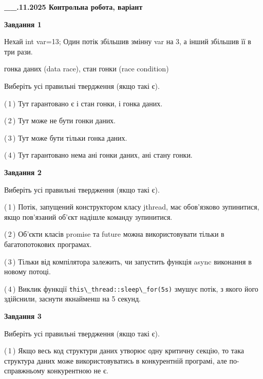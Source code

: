 \documentclass[12pt, ukrainian]{article}
\def\code#1{\Verb!#1!}
\begin{document}
\begin {large}

\textbf{\_\_.11.2025 Контрольна робота, варіант  }\par


{

\begin{center}
\textbf{Завдання 1}
\end{center}
Нехай int var=13; Один потік збільшив змінну var на 3, а інший збільшив її в три рази.

гонка даних (data race), стан гонки (race condition)

Виберіть усі правильні твердження (якщо такі є).\par
\vspace{2mm}
(\,1\,) Тут гарантовано є і стан гонки, і гонка даних.%

(\,2\,) Тут може не бути гонки даних.%

(\,3\,) Тут може бути тільки гонка даних.%

(\,4\,) Тут гарантовано нема ані гонки даних, ані стану гонки.%



\begin{center}
\textbf{Завдання 2}
\end{center}
Виберіть усі правильні твердження (якщо такі є).\par
\vspace{2mm}

(\,1\,) Потік, запущений конструктором класу jthread, має обов’язково зупинитися, якщо пов’язаний об’єкт надішле команду зупинитися.%

(\,2\,) Об’єкти класів promise та future можна використовувати тільки в багатопотокових програмах.%

(\,3\,) Тільки від компілятора залежить, чи запустить функція async виконання в новому потоці.%

(\,4\,) Виклик функції \code{this\_thread::sleep\_for(5s)} змушує потік, з якого його здійснили, заснути якнайменш на 5 секунд.%



\begin{center}
\textbf{Завдання 3}
\end{center}
Виберіть усі правильні твердження (якщо такі є).\par
\vspace{2mm}

(\,1\,) Якщо весь код структури даних утворює одну критичну секцію, то така структура даних може використовуватись в конкурентній програмі, але по-справжньо\-му конкурентною не є.%

}
\end{large}
\end{document}
